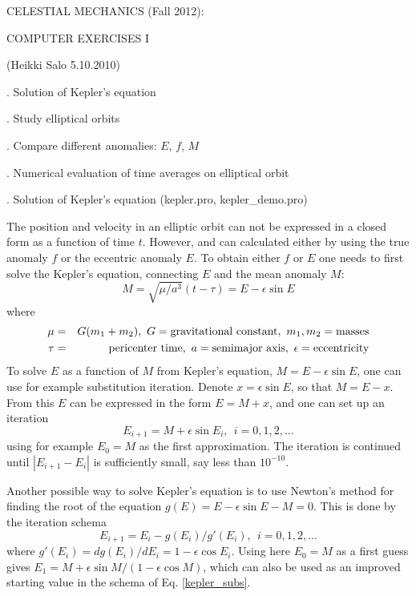 \documentclass[a4paper,12pt]{article}
\begin{document}
{\centerline{}




{\norm
\vskip 0cm
{{\centerline { {\isob CELESTIAL MECHANICS (Fall 2012): }}}}
\vskip 0.2cm
{{\centerline { {\isob COMPUTER EXERCISES I}}}}

{{\centerline { { (Heikki Salo 5.10.2010)}}}}

\vskip 2cm
{. Solution of Kepler's equation}

{. Study elliptical orbits}

{. Compare different anomalies: $E$, $f$, $M$}

{. Numerical evaluation of time averages on elliptical orbit}



\newpage

{. Solution of Kepler's equation} (kepler.pro, kepler\_demo.pro)


The position \RR and velocity \VV in an elliptic orbit 
can not be expressed in a closed form as a function of time $t$.  However,
\RR and \VV can calculated either by using the true anomaly
$f$ or the eccentric anomaly $E$. To obtain either $f$ or $E$ one
needs to first solve the Kepler's equation, connecting $E$ and the
mean anomaly $M$:
\begin{equation}
M = \sqrt{\mu/a^3} (t-\tau) = E - \epsilon \sin E
\end{equation}
\noindent where
\begin{eqnarray}
\mu  &=& G (m_1 +m_2), \ G= {\rm gravitational \ constant}, \ m_1, m_2 = {\rm masses} \nonumber \\
\tau &=& { \rm pericenter \ time}, \ a   = { \rm semimajor \ axis}, \ \epsilon =  { \rm eccentricity} \nonumber
\end{eqnarray}
\noindent
To solve $E$ as a function of $M$ from Kepler's equation, $M = E - \epsilon \sin E$, one can use for example substitution iteration. Denote
$x= \epsilon \sin E $, so that $M=E-x$. From this $E$ can be expressed in the form $E=M+x$, and one can set up an iteration
\begin{equation}
E_{i+1} = M + \epsilon \sin E_i, \ \  i=0,1,2,...
\label{kepler_subs}
\end{equation}
\noindent using for example $E_0=M$ as the first approximation. The
iteration is continued until $|E_{i+1} -E_i|$ is sufficiently small,
say less than $10^{-10}$.

Another possible way to solve Kepler's equation is to use 
Newton's method for finding the root of the equation $g(E) = E -\epsilon \sin E -M = 0$.  This is done by the iteration schema
\begin{equation}
E_{i+1} = E_i - g(E_i)/g'(E_i), \ \  i=0,1,2,...
\end{equation}
\noindent where $g' (E_i)= dg(E_i)/dE_i = 1 - \epsilon \cos E_i$.
Using here $E_0=M$ as a first guess gives $E_1=M +\epsilon \sin M/(1-\epsilon \cos M )$, which can also be used as an improved starting value in the schema of Eq. \ref{kepler_subs}.

}}
\end{document}
